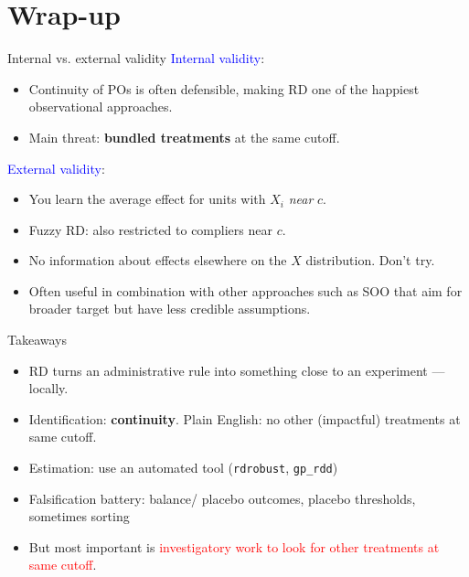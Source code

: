 \documentclass[xcolor=dvipsnames]{beamer}
\begin{document}
\section{Wrap-up}

\begin{frame}{Internal vs. external validity}
\small
{} \textcolor{Blue}{Internal validity}:
\begin{itemize}
\footnotesize
  \item Continuity of POs is often defensible, making RD one of the happiest observational approaches. 
  \item Main threat: \textbf{bundled treatments} at the same cutoff.
\end{itemize}
\medskip
{} \textcolor{Blue}{External validity}:
\begin{itemize}
\footnotesize
  \item You learn the average effect for units with $X_i$ \textit{near} $c$.
  \item Fuzzy RD: also restricted to compliers near $c$.
  \item No information about effects elsewhere on the $X$ distribution. Don't try.
  \item Often useful in combination with other approaches such as SOO that aim for broader target but have less credible assumptions.
\end{itemize}
\end{frame}


\begin{frame}{Takeaways}
\small
\begin{itemize}
\item<1-> RD turns an administrative rule into something close to an experiment --- locally.
\medskip
\item<2-> Identification: \textbf{continuity}. Plain English: no other (impactful) treatments at same cutoff. 
\medskip
\item<3-> Estimation: use an automated tool (\texttt{rdrobust}, \texttt{gp\_rdd})
\medskip
\item<4-> Falsification battery: balance/ placebo outcomes, placebo thresholds, sometimes sorting
\medskip
\item<5-> But most important is \textcolor{Red}{investigatory work to look for other treatments at same cutoff}.
\end{itemize}
\end{frame}
\end{document}
